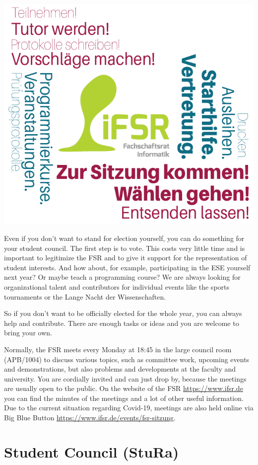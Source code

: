 \includegraphics{img/f1_neu.png}

Even if you don't want to stand for election yourself, you can do something for your student council.
The first step is to vote. This costs very little time and is important to legitimize the FSR and to give it support for the representation of student interests.
And how about, for example, participating in the ESE yourself next year?
Or maybe teach a programming course?
We are always looking for organizational talent and contributors for individual events like the sports tournaments or the Lange Nacht der Wissenschaften.

So if you don't want to be officially elected for the whole year, you can always help and contribute.
There are enough tasks or ideas and you are welcome to bring your own.

Normally, the FSR meets every Monday at 18:45 in the large council room (APB/1004) to discuss various topics, such as committee work, upcoming events and demonstrations, but also problems and developments at the faculty and university. You are cordially invited and can just drop by, because the meetings are usually open to the public. On the website of the FSR \url{https://www.ifsr.de}  you can find the minutes of the meetings and a lot of other useful information. Due to the current situation regarding Covid-19, meetings are also held online via Big Blue Button  \url{https://www.ifsr.de/events/fsr-sitzung}.

\section{Student Council (StuRa)}\label{sec:stura}

